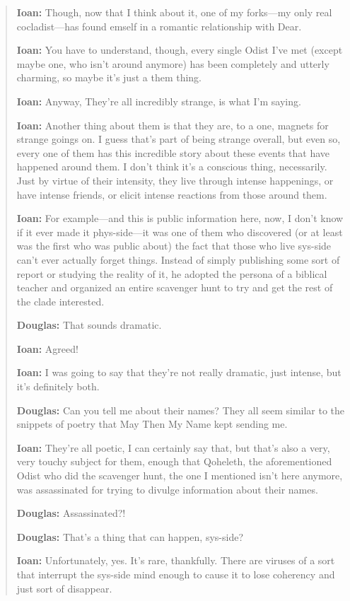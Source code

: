 \begin{quote}
\textbf{Ioan:} Though, now that I think about it, one of my forks---my only real cocladist---has found emself in a romantic relationship with Dear.

\textbf{Ioan:} You have to understand, though, every single Odist I've met (except maybe one, who isn't around anymore) has been completely and utterly charming, so maybe it's just a them thing.

\textbf{Ioan:} Anyway, They're all incredibly strange, is what I'm saying.

\textbf{Ioan:} Another thing about them is that they are, to a one, magnets for strange goings on. I guess that's part of being strange overall, but even so, every one of them has this incredible story about these events that have happened around them. I don't think it's a conscious thing, necessarily. Just by virtue of their intensity, they live through intense happenings, or have intense friends, or elicit intense reactions from those around them.

\textbf{Ioan:} For example---and this is public information here, now, I don't know if it ever made it phys-side---it was one of them who discovered (or at least was the first who was public about) the fact that those who live sys-side can't ever actually forget things. Instead of simply publishing some sort of report or studying the reality of it, he adopted the persona of a biblical teacher and organized an entire scavenger hunt to try and get the rest of the clade interested.

\textbf{Douglas:} That sounds dramatic.

\textbf{Ioan:} Agreed!

\textbf{Ioan:} I was going to say that they're not really dramatic, just intense, but it's definitely both.

\textbf{Douglas:} Can you tell me about their names? They all seem similar to the snippets of poetry that May Then My Name kept sending me.

\textbf{Ioan:} They're all poetic, I can certainly say that, but that's also a very, very touchy subject for them, enough that Qoheleth, the aforementioned Odist who did the scavenger hunt, the one I mentioned isn't here anymore, was assassinated for trying to divulge information about their names.

\textbf{Douglas:} Assassinated?!

\textbf{Douglas:} That's a thing that can happen, sys-side?

\textbf{Ioan:} Unfortunately, yes. It's rare, thankfully. There are viruses of a sort that interrupt the sys-side mind enough to cause it to lose coherency and just sort of disappear.


\end{quote}
